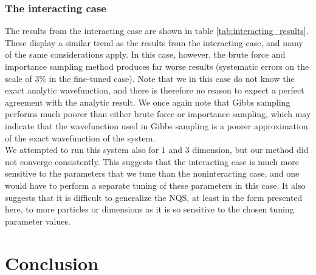 \documentclass[a4paper, 10pt]{article}
\begin{document}
\subsubsection{The interacting case}\label{sec:disc_result_interacting}
The results from the interacting case are shown in table \ref{tab:interacting_results}. These display a similar trend as the results from the interacting case, and many of the same considerations apply. In this case, however, the brute force and importance sampling method produces far worse results (systematic errors on the scale of $3\%$ in the fine-tuned case). Note that we in this case do not know the exact analytic wavefunction, and there is therefore no reason to expect a perfect agreement with the analytic result. We once again note that Gibbs sampling performs much poorer than either brute force or importance sampling, which may indicate that the wavefunction used in Gibbs sampling is a poorer approximation of the exact wavefunction of the system.\\
\linebreak
We attempted to run this system also for $1$ and $3$ dimension, but our method did not converge consistently. This suggests that the interacting case is much more sensitive to the parameters that we tune than the noninteracting case, and one would have to perform a separate tuning of these parameters in this case. It also suggests that it is difficult to generalize the NQS, at least in the form presented here, to more particles or dimensions as it is so sensitive to the chosen tuning parameter values.
\section{Conclusion}
\end{document}

